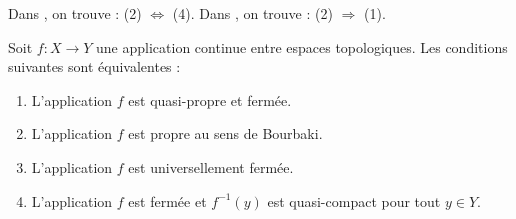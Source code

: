 \begin{theorem}
\label{theorem-characterize-proper}
\begin{reference}
Dans \cite[I, p. 75, théorème 1]{Bourbaki}, on trouve :
(2) $\Leftrightarrow$ (4).
Dans \cite[I, p. 77, Proposition 6]{Bourbaki}, on trouve :
(2) $\Rightarrow$ (1).
\end{reference}
Soit $f: X\to Y$ une application continue entre espaces topologiques.
Les conditions suivantes sont équivalentes :
\begin{enumerate}
\item L'application $f$ est quasi-propre et fermée.
\item L'application $f$ est propre au sens de Bourbaki.
\item L'application $f$ est universellement fermée.
\item L'application $f$ est fermée et $f^{-1}(y)$ est quasi-compact pour tout
$y\in Y$.
\end{enumerate}
\end{theorem}

